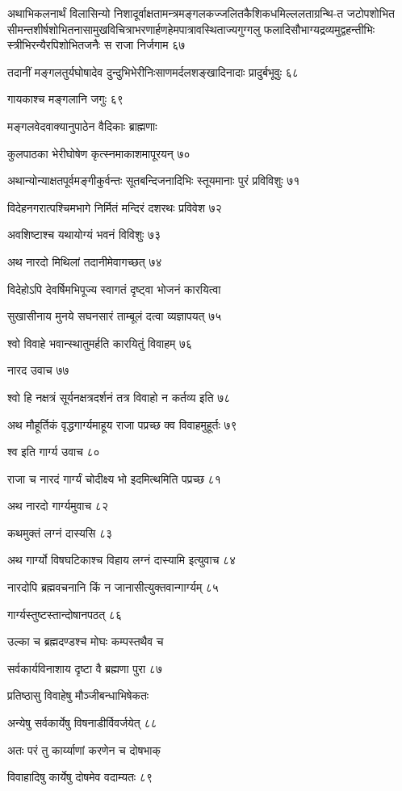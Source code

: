 अथाभिकलनार्थं विलासिन्यो निशादूर्वाक्षतामन्त्रमङ्गलकज्जलितकैशिकधमिल्ललताग्रन्थि-त
जटोपशोभित सीमन्तशीर्षशोभितनासामुखविचित्राभरणार्हणहेमपात्रावस्थिताज्यगुग्गलु
फलादिसौभाग्यद्रव्यमुद्वहन्तीभिः स्त्रीभिरन्यैरपिशोभितजनैः स राजा निर्जगाम ६७

तदानीं मङ्गलतुर्यघोषादेव दुन्दुभिभेरीनिःसाणमर्दलशङ्खादिनादाः प्रादुर्बभूवुः ६८

गायकाश्च मङ्गलानि जगुः ६९

मङ्गलवेदवाक्यानुपाठेन वैदिकाः ब्राह्मणाः

कुलपाठका भेरीघोषेण कृत्स्नमाकाशमापूरयन् ७०

अथान्योन्याक्षतपूर्वमङ्गीकुर्वन्तः सूतबन्दिजनादिभिः स्तूयमानाः पुरं प्रविविशुः ७१

विदेहनगरात्पश्चिमभागे निर्मितं मन्दिरं दशरथः प्रविवेश ७२

अवशिष्टाश्च यथायोग्यं भवनं विविशुः ७३

अथ नारदो मिथिलां तदानीमेवागच्छत् ७४

विदेहोऽपि देवर्षिमभिपूज्य स्वागतं दृष्ट्वा भोजनं कारयित्वा

सुखासीनाय मुनये सघनसारं ताम्बूलं दत्वा व्यज्ञापयत् ७५

श्वो विवाहे भवान्स्थातुमर्हति कारयितुं विवाहम् ७६

नारद उवाच ७७

श्वो हि नक्षत्रं सूर्यनक्षत्रदर्शनं तत्र विवाहो न कर्तव्य इति ७८

अथ मौहूर्तिकं वृद्धगार्ग्यमाहूय राजा पप्रच्छ क्व विवाहमुहूर्तः ७९

श्व इति गार्ग्य उवाच ८०

राजा च नारदं गार्ग्यं चोदीक्ष्य भो इदमित्थमिति पप्रच्छ ८१

अथ नारदो गार्ग्यमुवाच ८२

कथमुक्तं लग्नं दास्यसि ८३

अथ गार्ग्यो विषघटिकाश्च विहाय लग्नं दास्यामि इत्युवाच ८४

नारदोपि ब्रह्मवचनानि किं न जानासीत्युक्तवान्गार्ग्यम् ८५

गार्ग्यस्तुष्टस्तान्दोषानपठत् ८६

उल्का च ब्रह्मदण्डश्च मोघः कम्पस्तथैव च

सर्वकार्यविनाशाय दृष्टा वै ब्रह्मणा पुरा ८७

प्रतिष्ठासु विवाहेषु मौञ्जीबन्धाभिषेकतः

अन्येषु सर्वकार्येषु विषनाडीर्विवर्जयेत् ८८

अतः परं तु कार्य्याणां करणेन च दोषभाक्

विवाहादिषु कार्येषु दोषमेव वदाम्यतः ८९


